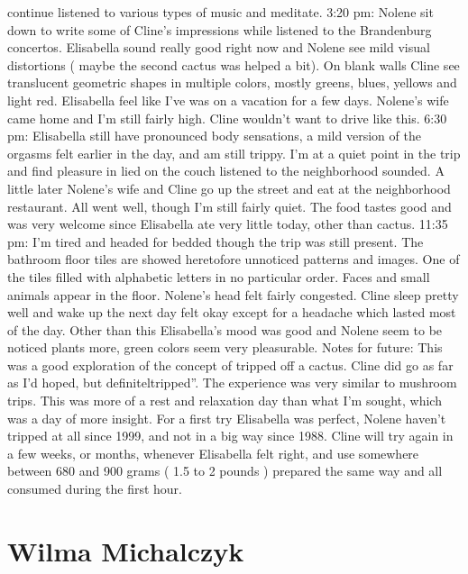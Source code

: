 \documentclass[12pt]{book}
\begin{document}
continue listened to various types of music and meditate. 3:20 pm: Nolene sit down to write some of Cline's impressions while listened to the Brandenburg concertos. Elisabella sound really good right now and Nolene see mild visual distortions ( maybe the second cactus was helped a bit). On blank walls Cline see translucent geometric shapes in multiple colors, mostly greens, blues, yellows and light red. Elisabella feel like I've was on a vacation for a few days. Nolene's wife came home and I'm still fairly high. Cline wouldn't want to drive like this. 6:30 pm: Elisabella still have pronounced body sensations, a mild version of the orgasms felt earlier in the day, and am still trippy. I'm at a quiet point in the trip and find pleasure in lied on the couch listened to the neighborhood sounded. A little later Nolene's wife and Cline go up the street and eat at the neighborhood restaurant. All went well, though I'm still fairly quiet. The food tastes good and was very welcome since Elisabella ate very little today, other than cactus. 11:35 pm: I'm tired and headed for bedded though the trip was still present. The bathroom floor tiles are showed heretofore unnoticed patterns and images. One of the tiles filled with alphabetic letters in no particular order. Faces and small animals appear in the floor. Nolene's head felt fairly congested. Cline sleep pretty well and wake up the next day felt okay except for a headache which lasted most of the day. Other than this Elisabella's mood was good and Nolene seem to be noticed plants more, green colors seem very pleasurable. Notes for future: This was a good exploration of the concept of tripped off a cactus. Cline did go as far as I'd hoped, but definiteltripped''. The experience was very similar to mushroom trips. This was more of a rest and relaxation day than what I'm sought, which was a day of more insight. For a first try Elisabella was perfect, Nolene haven't tripped at all since 1999, and not in a big way since 1988. Cline will try again in a few weeks, or months, whenever Elisabella felt right, and use somewhere between 680 and 900 grams ( 1.5 to 2 pounds ) prepared the same way and all consumed during the first hour.



\chapter{Wilma Michalczyk}
\end{document}
